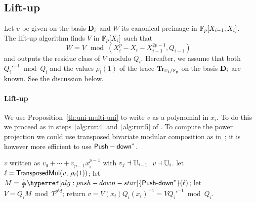 \subsection{Lift-up}
\label{sec:level-embedding:lift-up}

Let $v$ be given on the basis $\mathbf{D}_i$ and $W$ its canonical
preimage in $\mathbb{F}_p[X_{i-1},X_i]$.  The lift-up algorithm finds $V$ in
$\mathbb{F}_p[X_i]$ such that
\begin{equation}
  \label{eq:93}
  W=V \mod
  (X_i^p-X_i-X_{i-1}^{2p-1},Q_{i-1})
\end{equation}
and outputs the residue class of $V$ modulo $Q_i$. Hereafter, we
assume that both $Q_i'^{-1} \bmod Q_i$ and the values $\rho_i(1)$ of
the trace $\operatorname{Tr}_{\mathbb{U}_i/\mathbb{F}_p}$ on the basis $\mathbf{D}_i$ are known.  See
the discussion below.

\paragraph{Lift-up}
We use Proposition~\ref{th:uni-multi-uni} to write $v$ as a
polynomial in $x_i$. To do this we proceed as in steps~\ref{alg:rur:4}
and~\ref{alg:rur:5} of \hyperref[alg:rur]{}.  To compute the power projection we
could use transposed bivariate modular composition as
in~\cite{shoup99}; it is however more efficient to use
\hyperref[alg:push-down-star]{${\sf Push-down}^\ast$}.

\begin{algorithm}
  \caption{\label{alg:liftup}}
  \begin{algorithmic}[1]
    \REQUIRE $v$ written as $v_0+\cdots+v_{p-1}x_i^{p-1}$ with $v_j \dashv \mathbb{U}_{i-1}$.
    \ENSURE $v\dashv \mathbb{U}_i$.
    \STATE \label{alg:lift-up:transmul} let $\ell = {\sf TransposedMul}(v,\,\rho_i(1))$;
    \STATE \label{alg:lift-up:pow} let $M=\frac{1}{T}\hyperref[alg:push-down-star]{\dual{{\text{\alg{Push-down}}}}}(\ell)$;
    \STATE \label{alg:lift-up:mult} let $V = Q_iM \bmod T^{p^id}$;
    \STATE \label{alg:lift-up:mulmod} return $v=V(x_i)Q_i(x_i)^{-1} = V {Q_i'}^{-1} \bmod Q_i$.
  \end{algorithmic}
\end{algorithm}

